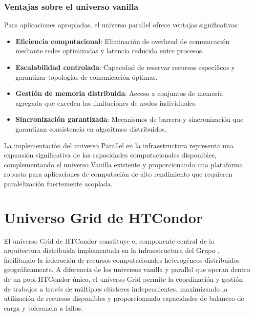 \subsubsection{Ventajas sobre el universo vanilla}
\noindent

Para aplicaciones apropiadas, el universo parallel ofrece ventajas significativas:

\begin{itemize}
	\item \textbf{Eficiencia computacional}: Eliminación de overhead de comunicación mediante redes optimizadas y latencia reducida entre procesos.
	
	\item \textbf{Escalabilidad controlada}: Capacidad de reservar recursos específicos y garantizar topologías de comunicación óptimas.
	
	\item \textbf{Gestión de memoria distribuida}: Acceso a conjuntos de memoria agregada que exceden las limitaciones de nodos individuales.
	
	\item \textbf{Sincronización garantizada}: Mecanismos de barrera y sincronización que garantizan consistencia en algoritmos distribuidos.
\end{itemize}

La implementación del universo Parallel en la infraestructura \GRID representa una expansión significativa de las capacidades computacionales disponibles, complementando el universo Vanilla existente y proporcionando una plataforma robusta para aplicaciones de computación de alto rendimiento que requieren paralelización fuertemente acoplada.

\section{Universo Grid de HTCondor}
\noindent

El universo Grid de HTCondor constituye el componente central de la arquitectura distribuida implementada en la infraestructura del Grupo \GRID, facilitando la federación de recursos computacionales heterogéneos distribuidos geográficamente. A diferencia de los universos vanilla y parallel que operan dentro de un pool HTCondor único, el universo Grid permite la coordinación y gestión de trabajos a través de múltiples clústeres independientes, maximizando la utilización de recursos disponibles y proporcionando capacidades de balanceo de carga y tolerancia a fallos.


